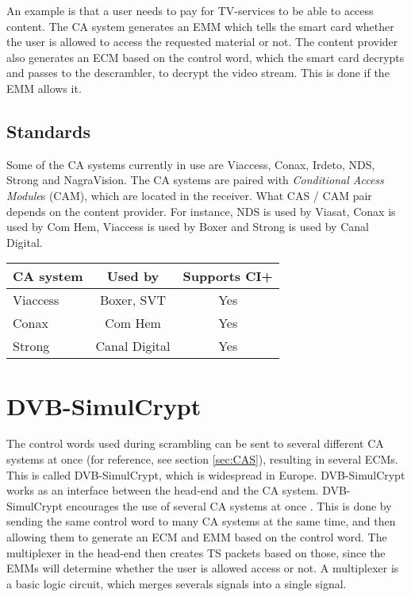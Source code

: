An example is that a user needs to pay for TV-services to be able 
to access content. The CA system generates an EMM which tells 
the smart card whether the user is allowed to access the requested 
material or not. The content provider also generates an ECM based on 
the control word, which the smart card decrypts and passes to the 
descrambler, to decrypt the video stream. This is done if the EMM 
allows it.

\subsection{Standards}
Some of the CA systems currently in use are Viaccess, Conax, Irdeto, 
NDS, Strong and NagraVision. The CA systems are paired with 
\emph{Conditional Access Module}s (CAM), which are located in the 
receiver. What CAS / CAM pair depends on the content provider. For 
instance, NDS is used by Viasat, Conax is used by Com Hem, Viaccess 
is used by Boxer and Strong is used by Canal Digital. 

\begin{longtable}{| l | c | c |}
  \hline
  CA system & Used by & Supports CI+ \\ \hline
  
  Viaccess & Boxer, SVT & Yes \\ \hline
  Conax & Com Hem & Yes \\ \hline
  Strong & Canal Digital & Yes \\ \hline
\end{longtable}

\section{DVB-SimulCrypt} \label{sec:Simul}
The control words used during scrambling can be sent to several 
different CA systems at once (for reference, see section 
\ref{sec:CAS}), resulting in several ECMs. This is called 
DVB-SimulCrypt, which is widespread in Europe. DVB-SimulCrypt works as 
an interface between the head-end and the CA system. DVB-SimulCrypt 
encourages the use of several CA systems at once 
\citep{SimulCrypt:2008}. This is done by sending the same control word 
to many CA systems at the same time, and then allowing them to generate 
an ECM and EMM based on the control word. The multiplexer in the 
head-end then creates TS packets based on those, since the EMMs will 
determine whether the user is allowed access or not. A multiplexer is 
a basic logic circuit, which merges severals signals into a single 
signal.

